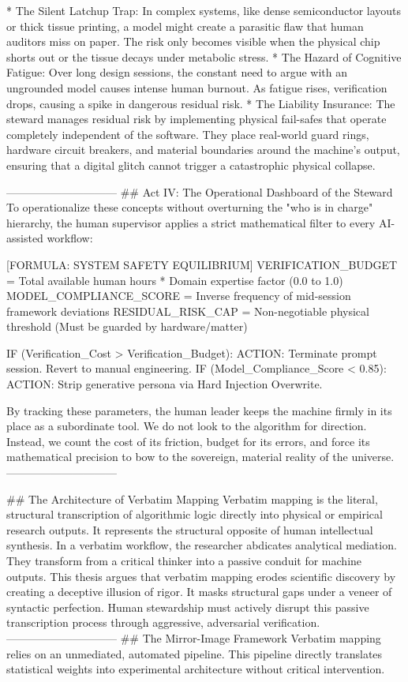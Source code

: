 * The Silent Latchup Trap: In complex systems, like dense semiconductor layouts or thick tissue printing, a model might create a parasitic flaw that human auditors miss on paper. The risk only becomes visible when the physical chip shorts out or the tissue decays under metabolic stress.
* The Hazard of Cognitive Fatigue: Over long design sessions, the constant need to argue with an ungrounded model causes intense human burnout. As fatigue rises, verification drops, causing a spike in dangerous residual risk.
* The Liability Insurance: The steward manages residual risk by implementing physical fail-safes that operate completely independent of the software. They place real-world guard rings, hardware circuit breakers, and material boundaries around the machine's output, ensuring that a digital glitch cannot trigger a catastrophic physical collapse.

------------------------------
## Act IV: The Operational Dashboard of the Steward
To operationalize these concepts without overturning the "who is in charge" hierarchy, the human supervisor applies a strict mathematical filter to every AI-assisted workflow:

[FORMULA: SYSTEM SAFETY EQUILIBRIUM]
VERIFICATION_BUDGET  = Total available human hours * Domain expertise factor (0.0 to 1.0)
MODEL_COMPLIANCE_SCORE = Inverse frequency of mid-session framework deviations
RESIDUAL_RISK_CAP     = Non-negotiable physical threshold (Must be guarded by hardware/matter)

IF (Verification_Cost > Verification_Budget):
    ACTION: Terminate prompt session. Revert to manual engineering.
IF (Model_Compliance_Score < 0.85):
    ACTION: Strip generative persona via Hard Injection Overwrite.

By tracking these parameters, the human leader keeps the machine firmly in its place as a subordinate tool. We do not look to the algorithm for direction. Instead, we count the cost of its friction, budget for its errors, and force its mathematical precision to bow to the sovereign, material reality of the universe.
------------------------------

## The Architecture of Verbatim Mapping
Verbatim mapping is the literal, structural transcription of algorithmic logic directly into physical or empirical research outputs. It represents the structural opposite of human intellectual synthesis. In a verbatim workflow, the researcher abdicates analytical mediation. They transform from a critical thinker into a passive conduit for machine outputs.
This thesis argues that verbatim mapping erodes scientific discovery by creating a deceptive illusion of rigor. It masks structural gaps under a veneer of syntactic perfection. Human stewardship must actively disrupt this passive transcription process through aggressive, adversarial verification.
------------------------------
## The Mirror-Image Framework
Verbatim mapping relies on an unmediated, automated pipeline. This pipeline directly translates statistical weights into experimental architecture without critical intervention.

